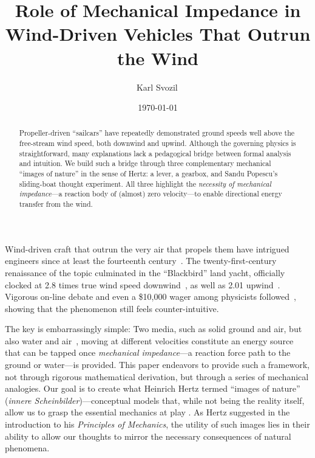 \documentclass[reprint,aps,pra,superscriptaddress,longbibliography]{revtex4-2}
\begin{document}
\title{Role of Mechanical Impedance in Wind-Driven Vehicles That Outrun the Wind}

\author{Karl Svozil\,}

\date{\today}

\begin{abstract}
Propeller-driven ``sailcars'' have repeatedly demonstrated ground speeds well above the free-stream wind speed, both downwind and upwind. Although the governing physics is straightforward, many explanations lack a pedagogical bridge between formal analysis and intuition. We build such a bridge through three complementary mechanical ``images of nature'' in the sense of Hertz: a lever, a gearbox, and Sandu Popescu's sliding-boat thought experiment. All three highlight the \emph{necessity of mechanical impedance}---a reaction body of (almost) zero velocity---to enable directional energy transfer from the wind.
\end{abstract}

\maketitle

Wind-driven craft that outrun the very air that propels them
have intrigued engineers since at least the fourteenth century~\cite{mcdonald2021}.
The twenty-first-century renaissance of the topic culminated in the ``Blackbird''
land yacht, officially clocked at \num{2.8} times true wind speed
downwind~\cite{nalsa2010}, as well as \num{2.01} upwind~\cite{blackbird2011-casterttw}. Vigorous on-line debate and even a
\$10,000 wager among physicists followed~\cite{veritasium2021,VeritasiumWager2021}, showing
that the phenomenon still feels counter-intuitive.

The key is embarrassingly simple: Two media, such as solid ground and air, but also water and air~\cite{Blackford1978}, moving at different velocities constitute an energy source that can be tapped once \emph{mechanical impedance}---a reaction force path to the ground or water---is provided.
This paper endeavors to provide such a framework, not through rigorous mathematical derivation, but through a series of mechanical analogies. Our goal is to create what Heinrich Hertz termed ``images of nature'' (\textit{innere Scheinbilder})---conceptual models that, while not being the reality itself, allow us to grasp the essential mechanics at play \cite{hertz-94e}. As Hertz suggested in the introduction to his \textit{Principles of Mechanics}, the utility of such images lies in their ability to allow our thoughts to mirror the necessary consequences of natural phenomena.
\end{document}
